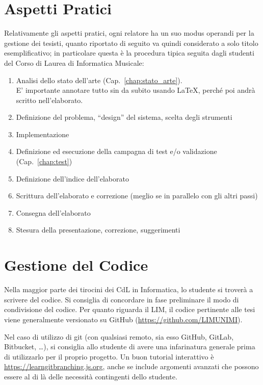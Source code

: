 \documentclass[12pt]{report}
\begin{document}
    \section{Aspetti Pratici}
    Relativamente gli aspetti pratici, ogni relatore ha un suo modus operandi per la gestione dei tesisti, quanto riportato di seguito va quindi considerato a solo titolo esemplificativo; in particolare questa è la procedura tipica seguita dagli studenti del Corso di Laurea di Informatica Musicale:
    \begin{enumerate}
        \item Analisi dello stato dell'arte (Cap.~\ref{chap:stato_arte}).\\E' importante annotare tutto sin da subito usando \LaTeX, perché poi andrà scritto nell'elaborato.
        \item Definizione del problema, ``design'' del sistema, scelta degli strumenti
        \item Implementazione
        \item Definizione ed esecuzione della campagna di test e/o validazione (Cap.~\ref{chap:test})
        \item Definizione dell'indice dell'elaborato
        \item Scrittura dell'elaborato e correzione (meglio se in parallelo con gli altri passi)
        \item Consegna dell'elaborato
        \item Stesura della presentazione, correzione, suggerimenti
    \end{enumerate}

    \section{Gestione del Codice}
    Nella maggior parte dei tirocini dei CdL in Informatica, lo studente si troverà a scrivere del codice. Si consiglia di concordare in fase preliminare il modo di condivisione del codice.
    Per quanto riguarda il LIM, il codice pertinente alle tesi viene generalmente versionato su GitHub (\url{https://github.com/LIMUNIMI}).

    Nel caso di utilizzo di git (con qualsiasi remoto, sia esso GitHub, GitLab, Bitbucket, \dots), si consiglia allo studente di avere una infarinatura generale prima di utilizzarlo per il proprio progetto. Un buon tutorial interattivo è \url{https://learngitbranching.js.org}, anche se include argomenti avanzati che possono essere al di là delle necessità contingenti dello studente.
\end{document}
